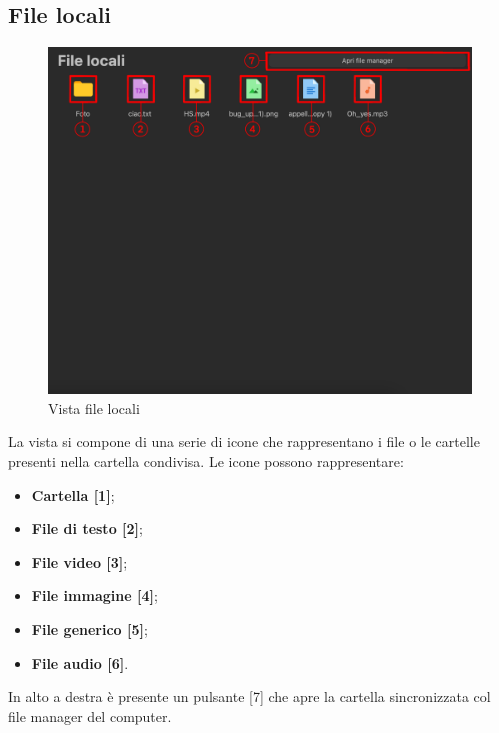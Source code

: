 \subsection{File locali}
\label{sec:fileLocali}
\begin{figure}[H]
    \centering
    \includegraphics[scale = 0.7]{components/img/fileLocali.png}
    \caption{Vista file locali}
    \label{fig:fileSync}
\end{figure}
La vista si compone di una serie di icone che rappresentano i file o le cartelle presenti nella cartella condivisa. Le icone possono rappresentare:
\begin{itemize}
\item \textbf{Cartella [1]};\
\item \textbf{File di testo [2]};\
\item \textbf{File video [3]};\
\item \textbf{File immagine [4]};\
\item \textbf{File generico [5]};\
\item \textbf{File audio [6]}.\
\end{itemize}
In alto a destra è presente un pulsante [7] che apre la cartella sincronizzata col file manager del computer.


